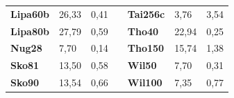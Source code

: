 \documentclass[a4paper, 12pt]{article}
\begin{document}
\begin{table}[H]
\begin{tabular}{|l|l|l|l|l|l|l|}
\textbf{Lipa60b}                    & 26,33                              & 0,41                                 &                                & \textbf{Tai256c}                   & 3,76                               & 3,54                                 \\ \cline{1-3} \cline{5-7} 
\textbf{Lipa80b}                    & 27,79                              & 0,59                                 &                                & \textbf{Tho40}                     & 22,94                              & 0,25                                 \\ \cline{1-3} \cline{5-7} 
\textbf{Nug28}                      & 7,70                               & 0,14                                 &                                & \textbf{Tho150}                    & 15,74                              & 1,38                                 \\ \cline{1-3} \cline{5-7} 
\textbf{Sko81}                      & 13,50                              & 0,58                                 &                                & \textbf{Wil50}                     & 7,70                               & 0,31                                 \\ \cline{1-3} \cline{5-7} 
\textbf{Sko90}                      & 13,54                              & 0,66                                 &                                & \textbf{Wil100}                    & 7,35                               & 0,77                                 \\ \cline{1-3} \cline{5-7} 
\end{tabular}
\end{table}
      
      \newpage
\end{document}
